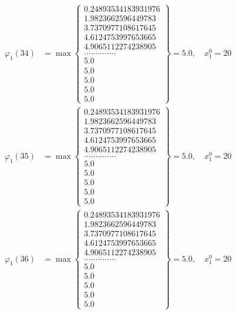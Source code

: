 \documentclass{article}
\begin{document}
\begin{align*}
  
  
  
\varphi_{1}(34) &= \max \left\{ \begin{array}{c}
0.24893534183931976 \\
 1.9823662596449783 \\
 3.7370977108617645 \\
 4.6124753997653665 \\
 4.9065112274238905 \\
 .............. \\
 5.0 \\
 5.0 \\
 5.0 \\
 5.0 \\
 5.0
\end{array} \right\} = 5.0, \quad x_{1}^0 = 20\\
  
  
  
  
\varphi_{1}(35) &= \max \left\{ \begin{array}{c}
0.24893534183931976 \\
 1.9823662596449783 \\
 3.7370977108617645 \\
 4.6124753997653665 \\
 4.9065112274238905 \\
 .............. \\
 5.0 \\
 5.0 \\
 5.0 \\
 5.0 \\
 5.0
\end{array} \right\} = 5.0, \quad x_{1}^0 = 20\\
  
  
  
  
\varphi_{1}(36) &= \max \left\{ \begin{array}{c}
0.24893534183931976 \\
 1.9823662596449783 \\
 3.7370977108617645 \\
 4.6124753997653665 \\
 4.9065112274238905 \\
 .............. \\
 5.0 \\
 5.0 \\
 5.0 \\
 5.0 \\
 5.0
\end{array} \right\} = 5.0, \quad x_{1}^0 = 20\\
  
  
\end{align*}
\end{document}
